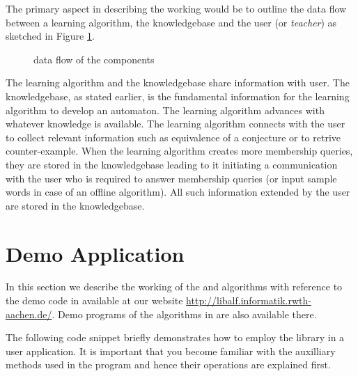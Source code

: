 The primary aspect in describing the working would be to outline the data flow between a learning algorithm, the knowledgebase and the user (or \emph{teacher}) as sketched in Figure \ref{communications}.

\begin{figure}
\centering
{}
\caption{data flow of the \libalf components}
\label{communications}
\end{figure}

The learning algorithm and the knowledgebase share information with user. The knowledgebase, as stated earlier, is the fundamental information for the learning algorithm to develop an automaton. The learning algorithm advances with whatever knowledge is available. The learning algorithm connects with the user to collect relevant information such as equivalence of a conjecture or to retrive counter-example. When the learning algorithm creates more membership queries, they are stored in the knowledgebase leading to it initiating a communication with the user who is required to answer membership queries (or input sample words in case of an offline algorithm). All such information extended by the user are stored in the knowledgebase. 

\section{Demo Application}

In this section we describe the working of the \offline and \online algorithms with reference to the demo code in \cpp available at our website \url{http://libalf.informatik.rwth-aachen.de/}. Demo programs of the algorithms in \java are also available there.

The following code snippet briefly demonstrates how to employ the \libalf library in a user application. It is important that you become familiar with the auxilliary methods used in the program and hence their operations are explained first.


